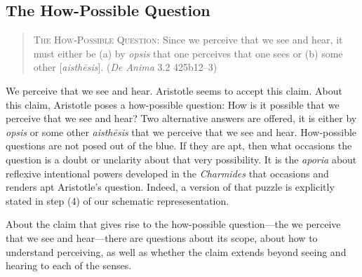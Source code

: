 

\subsection{The How-Possible Question} %
\label{sub:the_how_possible_question}

\begin{quote}
	\textsc{The How-Possible Question}: Since we perceive that we see and hear, it must either be (a) by \emph{opsis} that one perceives that one sees or (b) some other [\emph{aisthēsis}]. (\emph{De Anima} 3.2 425b12–3)
\end{quote}

We perceive that we see and hear. Aristotle seems to accept this claim. About this claim, Aristotle poses a how-possible question: How is it possible that we perceive that we see and hear? Two alternative answers are offered, it is either by \emph{opsis} or some other \emph{aisthēsis} that we perceive that we see and hear. How-possible questions are not posed out of the blue. If they are apt, then what occasions the question is a doubt or unclarity about that very possibility. It is the \emph{aporia} about reflexive intentional powers developed in the \emph{Charmides} that occasions and renders apt Aristotle's question. Indeed, a version of that puzzle is explicitly stated in step (4) of our schematic represesentation.

About the claim that gives rise to the how-possible question—the we perceive that we see and hear—there are questions about its scope, about how to understand perceiving, as well as whether the claim extends beyond seeing and hearing to each of the senses.

